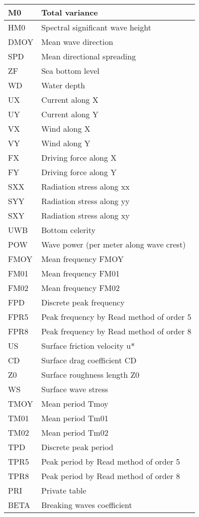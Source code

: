 \begin{tabular}{|p{1.4in}|p{2.1in}|} \hline
M0 &  Total variance \\ \hline
HM0  &  Spectral significant wave height  \\ \hline
DMOY  &  Mean wave direction  \\ \hline
SPD  &  Mean directional spreading  \\ \hline
ZF &  Sea bottom level  \\ \hline
WD &  Water depth  \\ \hline
UX &  Current along X  \\ \hline
UY &  Current along Y  \\ \hline
VX &  Wind along X  \\ \hline
VY &  Wind along Y  \\ \hline
FX &  Driving force along X  \\ \hline
FY &  Driving force along Y  \\ \hline
SXX  &  Radiation stress along xx  \\ \hline
SYY  &  Radiation stress along yy  \\ \hline
SXY  &  Radiation stress along xy  \\ \hline
UWB  &  Bottom celerity  \\ \hline
POW  &  Wave power (per meter along wave crest)  \\ \hline
FMOY  &  Mean frequency FMOY  \\ \hline
FM01  &  Mean frequency FM01  \\ \hline
FM02  &  Mean frequency FM02  \\ \hline
FPD  &  Discrete peak frequency  \\ \hline
FPR5  &  Peak frequency by Read method of order 5  \\ \hline
FPR8  &  Peak frequency by Read method of order 8  \\ \hline
US &  Surface friction velocity u*  \\ \hline
CD &  Surface drag coefficient CD  \\ \hline
Z0 &  Surface roughness length Z0  \\ \hline
WS &  Surface wave stress  \\ \hline
TMOY  &  Mean period Tmoy  \\ \hline
TM01  &  Mean period Tm01  \\ \hline
TM02  &  Mean period Tm02  \\ \hline
TPD  &  Discrete peak period  \\ \hline
TPR5  &  Peak period by Read method of order 5  \\ \hline
TPR8  &  Peak period by Read method of order 8  \\ \hline
PRI  &  Private table  \\ \hline
BETA &  Breaking waves coefficient \\ \hline
\end{tabular}

